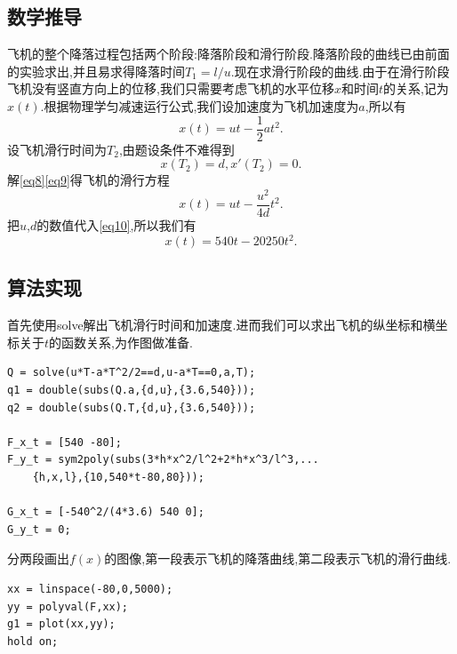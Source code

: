 \documentclass[a4paper,12pt]{article}
\begin{document}
\begin{CJK*}{UTF8}{gbsn}
\subsection{数学推导}
飞机的整个降落过程包括两个阶段:降落阶段和滑行阶段.降落阶段的曲线已由前面的实验求出,并且易求得降落时间$T_1=l/u$.现在求滑行阶段的曲线.由于在滑行阶段飞机没有竖直方向上的位移,我们只需要考虑飞机的水平位移$x$和时间$t$的关系,记为$x(t)$.根据物理学匀减速运行公式,我们设加速度为飞机加速度为$a$,所以有
\begin{equation}
x(t)=ut-\frac{1}{2}at^2. \label{eq8}
\end{equation}
设飞机滑行时间为$T_2$,由题设条件不难得到
\begin{equation}
x(T_2)=d,x'(T_2)=0. \label{eq9}
\end{equation}
解\eqref{eq8}\eqref{eq9}得飞机的滑行方程
\begin{equation}
x(t)=ut-\frac{u^2}{4d}t^2. \label{eq10}
\end{equation}
把$u$,$d$的数值代入\eqref{eq10},所以我们有
\begin{equation*}
x(t)=540t-20250t^2.
\end{equation*}
\subsection{算法实现}
首先使用solve解出飞机滑行时间和加速度.进而我们可以求出飞机的纵坐标和横坐标关于$t$的函数关系,为作图做准备.
\vspace{-11pt}
\begin{lstlisting}
Q = solve(u*T-a*T^2/2==d,u-a*T==0,a,T);
q1 = double(subs(Q.a,{d,u},{3.6,540}));
q2 = double(subs(Q.T,{d,u},{3.6,540}));

F_x_t = [540 -80];
F_y_t = sym2poly(subs(3*h*x^2/l^2+2*h*x^3/l^3,...
    {h,x,l},{10,540*t-80,80}));

G_x_t = [-540^2/(4*3.6) 540 0];
G_y_t = 0;
\end{lstlisting}
\vspace{7pt}
\par 分两段画出$f(x)$的图像,第一段表示飞机的降落曲线,第二段表示飞机的滑行曲线.
\vspace{-11pt}
\begin{lstlisting}
xx = linspace(-80,0,5000);
yy = polyval(F,xx);
g1 = plot(xx,yy);
hold on;


\end{lstlisting}
\end{CJK*}
\end{document}
